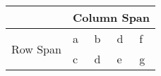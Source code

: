 \begin{table}[]
    \begin{tabular}{lllll}
    \hline
    \textbf{} & \multicolumn{4}{l}{Column Span} \\ \hline
    \multirow{2}{*}{Row Span} & a & b & d & f \\
     & c & d & e & g \\ \hline
    \end{tabular}
\end{table}
